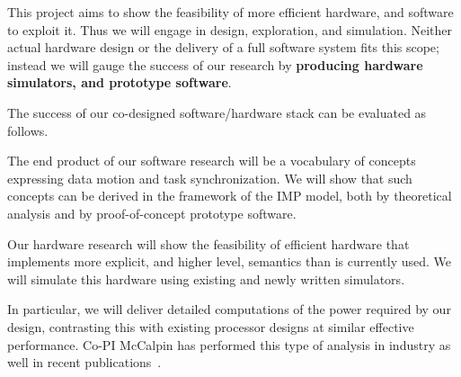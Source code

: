 This project aims to show the feasibility of 
more efficient hardware, and software to exploit it.
Thus we will engage in design, exploration, and simulation.
Neither actual hardware design or the delivery of a full 
software system fits this scope; instead we will 
gauge the success of our research by
\textbf{producing hardware simulators, and prototype software}.

The success of our co-designed software/hardware stack
can be evaluated as follows.

The end product of our software research will 
be a vocabulary of concepts expressing
data motion and task synchronization. We will show 
that such concepts can be derived in the framework
of the \ac{IMP} model, both by theoretical analysis
and by proof-of-concept prototype software.

Our hardware research will show the feasibility 
of efficient hardware that implements
more explicit, and higher level, semantics
than is currently used. We will simulate 
this hardware using existing and newly written simulators.

In particular,
we will deliver detailed computations of the power required
by our design, contrasting this with existing processor designs
at similar effective performance. Co-PI McCalpin
has performed this type of analysis in industry 
as well in recent publications~\cite{ASAP2013,MulticoreLAFC_2014}.
